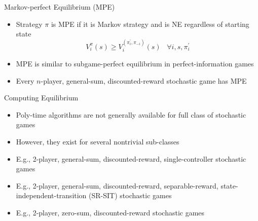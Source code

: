 \documentclass[11pt,aspectratio=169]{beamer}
\begin{document}
  
  \begin{frame}{Markov-perfect Equilibrium (MPE)}
   \begin{itemize}
   \setlength{\itemsep}{1.5em}
    \item Strategy $\pi$ is \alert{MPE} if it is Markov strategy and is NE regardless of starting state
    $$V_i^{\pi}(s) \ge V_i^{(\pi^\prime_i, \pi_{-i})}(s) \;\;\; \forall i, s, \pi_i^\prime$$
    \item MPE is similar to \alert{subgame-perfect equilibrium} in perfect-information games
    \item Every $n$-player, general-sum, \alert{discounted-reward} stochastic game has MPE
   \end{itemize}
  \end{frame}
  
  
  \begin{frame}{Computing Equilibrium}
   \begin{itemize}[<+->] 
   \setlength{\itemsep}{0.7em}
    \item Poly-time algorithms are not generally available for full class of stochastic games
    \item However, they exist for several nontrivial sub-classes
    \item E.g., 2-player, general-sum, discounted-reward, \alert{single-controller} stochastic games
    \item E.g., 2-player, general-sum, discounted-reward, \alert{separable-reward, state-independent-transition (SR-SIT)} stochastic games
    \item E.g., 2-player, zero-sum, discounted-reward stochastic games
   \end{itemize}
  \end{frame}
  
\end{document}

